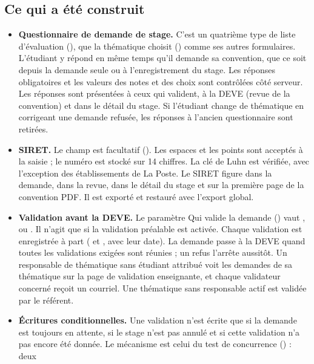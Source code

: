 \documentclass[11pt,a4paper]{article}
\begin{document}
\subsection{Ce qui a été construit}

\begin{itemize}
  \item \textbf{Questionnaire de demande de stage.} C'est un quatrième type de liste
    d'évaluation (), que la thématique choisit ()
    comme ses autres formulaires. L'étudiant y répond en même temps qu'il demande sa convention,
    que ce soit depuis la demande seule ou à l'enregistrement du stage. Les réponses obligatoires
    et les valeurs des notes et des choix sont contrôlées côté serveur. Les réponses sont
    présentées à ceux qui valident, à la DEVE (revue de la convention) et dans le détail du stage.
    Si l'étudiant change de thématique en corrigeant une demande refusée, les réponses à l'ancien
    questionnaire sont retirées.
  \item \textbf{SIRET.} Le champ est facultatif (). Les espaces
    et les points sont acceptés à la saisie ; le numéro est stocké sur 14 chiffres. La clé de Luhn
    est vérifiée, avec l'exception des établissements de La Poste. Le SIRET figure dans la demande,
    dans la revue, dans le détail du stage et sur la première page de la convention PDF. Il est
    exporté et restauré avec l'export global.
  \item \textbf{Validation avant la DEVE.} Le paramètre \og Qui valide la demande\fg{}
    () vaut ,  ou .
    Il n'agit que si la validation préalable est activée. Chaque validation est enregistrée à part
    ( et , avec leur date).
    La demande passe à la DEVE quand toutes les validations exigées sont réunies ; un refus
    l'arrête aussitôt. Un responsable de thématique sans étudiant attribué voit les demandes de sa
    thématique sur la page de validation enseignante, et chaque validateur concerné reçoit un
    courriel. Une thématique sans responsable actif est validée par le référent.
  \item \textbf{Écritures conditionnelles.} Une validation n'est écrite que si la demande est
    toujours en attente, si le stage n'est pas annulé et si cette validation n'a pas encore été
    donnée. Le mécanisme est celui du test de concurrence () : deux

\end{itemize}
\end{document}
